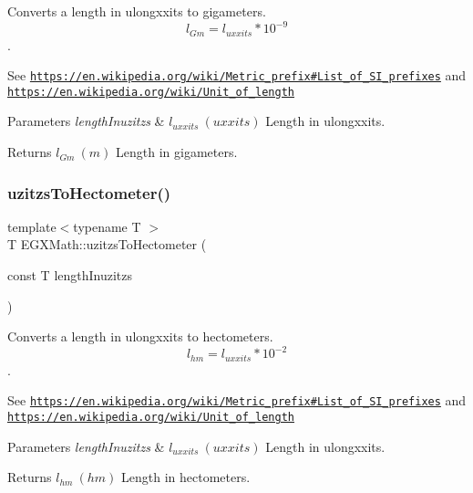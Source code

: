 Converts a length in ulongxxits to gigameters. \[ l_{Gm}=l_{uxxits} * 10^{-9} \]. 

See \href{https://en.wikipedia.org/wiki/Metric_prefix#List_of_SI_prefixes}{\tt https\+://en.\+wikipedia.\+org/wiki/\+Metric\+\_\+prefix\#\+List\+\_\+of\+\_\+\+S\+I\+\_\+prefixes} and \href{https://en.wikipedia.org/wiki/Unit_of_length}{\tt https\+://en.\+wikipedia.\+org/wiki/\+Unit\+\_\+of\+\_\+length} 
\begin{DoxyParams}{Parameters}
{\em length\+Inuzitzs} & $ l_{uxxits}\ (uxxits)$ Length in ulongxxits. \\
\hline
\end{DoxyParams}
\begin{DoxyReturn}{Returns}
$ l_{Gm}\ (m)$ Length in gigameters. 
\end{DoxyReturn}
\mbox{\label{group___e_g_x_math-_conversions-_length_conversions-uzitzs-_s_i_gabc1973b8ea47e021bd981f94ac1f254d}} 
\subsubsection{\texorpdfstring{uzitzs\+To\+Hectometer()}{uzitzsToHectometer()}}
{\footnotesize\ttfamily template$<$typename T $>$ \\
T E\+G\+X\+Math\+::uzitzs\+To\+Hectometer (\begin{DoxyParamCaption}\item[{const T}]{length\+Inuzitzs }\end{DoxyParamCaption})}



Converts a length in ulongxxits to hectometers. \[ l_{hm}=l_{uxxits} * 10^{-2} \]. 

See \href{https://en.wikipedia.org/wiki/Metric_prefix#List_of_SI_prefixes}{\tt https\+://en.\+wikipedia.\+org/wiki/\+Metric\+\_\+prefix\#\+List\+\_\+of\+\_\+\+S\+I\+\_\+prefixes} and \href{https://en.wikipedia.org/wiki/Unit_of_length}{\tt https\+://en.\+wikipedia.\+org/wiki/\+Unit\+\_\+of\+\_\+length} 
\begin{DoxyParams}{Parameters}
{\em length\+Inuzitzs} & $ l_{uxxits}\ (uxxits)$ Length in ulongxxits. \\
\hline
\end{DoxyParams}
\begin{DoxyReturn}{Returns}
$ l_{hm}\ (hm)$ Length in hectometers. 
\end{DoxyReturn}
\mbox{\label{group___e_g_x_math-_conversions-_length_conversions-uzitzs-_s_i_ga43a39eb66f3250c955de8fb2beff314c}} 
